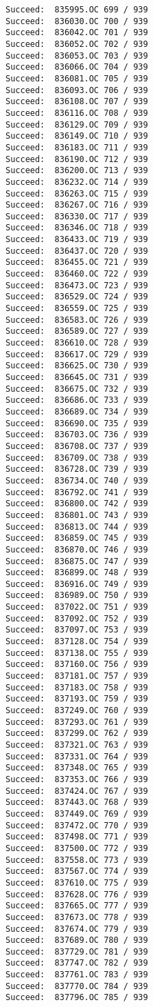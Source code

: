 \documentclass[11pt]{article}
\begin{document}
\begin{verbatim}
Succeed:  835995.OC 699 / 939
Succeed:  836030.OC 700 / 939
Succeed:  836042.OC 701 / 939
Succeed:  836052.OC 702 / 939
Succeed:  836053.OC 703 / 939
Succeed:  836066.OC 704 / 939
Succeed:  836081.OC 705 / 939
Succeed:  836093.OC 706 / 939
Succeed:  836108.OC 707 / 939
Succeed:  836116.OC 708 / 939
Succeed:  836129.OC 709 / 939
Succeed:  836149.OC 710 / 939
Succeed:  836183.OC 711 / 939
Succeed:  836190.OC 712 / 939
Succeed:  836200.OC 713 / 939
Succeed:  836232.OC 714 / 939
Succeed:  836263.OC 715 / 939
Succeed:  836267.OC 716 / 939
Succeed:  836330.OC 717 / 939
Succeed:  836346.OC 718 / 939
Succeed:  836433.OC 719 / 939
Succeed:  836437.OC 720 / 939
Succeed:  836455.OC 721 / 939
Succeed:  836460.OC 722 / 939
Succeed:  836473.OC 723 / 939
Succeed:  836529.OC 724 / 939
Succeed:  836559.OC 725 / 939
Succeed:  836583.OC 726 / 939
Succeed:  836589.OC 727 / 939
Succeed:  836610.OC 728 / 939
Succeed:  836617.OC 729 / 939
Succeed:  836625.OC 730 / 939
Succeed:  836645.OC 731 / 939
Succeed:  836675.OC 732 / 939
Succeed:  836686.OC 733 / 939
Succeed:  836689.OC 734 / 939
Succeed:  836690.OC 735 / 939
Succeed:  836703.OC 736 / 939
Succeed:  836708.OC 737 / 939
Succeed:  836709.OC 738 / 939
Succeed:  836728.OC 739 / 939
Succeed:  836734.OC 740 / 939
Succeed:  836792.OC 741 / 939
Succeed:  836800.OC 742 / 939
Succeed:  836801.OC 743 / 939
Succeed:  836813.OC 744 / 939
Succeed:  836859.OC 745 / 939
Succeed:  836870.OC 746 / 939
Succeed:  836875.OC 747 / 939
Succeed:  836899.OC 748 / 939
Succeed:  836916.OC 749 / 939
Succeed:  836989.OC 750 / 939
Succeed:  837022.OC 751 / 939
Succeed:  837092.OC 752 / 939
Succeed:  837097.OC 753 / 939
Succeed:  837128.OC 754 / 939
Succeed:  837138.OC 755 / 939
Succeed:  837160.OC 756 / 939
Succeed:  837181.OC 757 / 939
Succeed:  837183.OC 758 / 939
Succeed:  837193.OC 759 / 939
Succeed:  837249.OC 760 / 939
Succeed:  837293.OC 761 / 939
Succeed:  837299.OC 762 / 939
Succeed:  837321.OC 763 / 939
Succeed:  837331.OC 764 / 939
Succeed:  837348.OC 765 / 939
Succeed:  837353.OC 766 / 939
Succeed:  837424.OC 767 / 939
Succeed:  837443.OC 768 / 939
Succeed:  837449.OC 769 / 939
Succeed:  837472.OC 770 / 939
Succeed:  837498.OC 771 / 939
Succeed:  837500.OC 772 / 939
Succeed:  837558.OC 773 / 939
Succeed:  837567.OC 774 / 939
Succeed:  837610.OC 775 / 939
Succeed:  837628.OC 776 / 939
Succeed:  837665.OC 777 / 939
Succeed:  837673.OC 778 / 939
Succeed:  837674.OC 779 / 939
Succeed:  837689.OC 780 / 939
Succeed:  837729.OC 781 / 939
Succeed:  837747.OC 782 / 939
Succeed:  837761.OC 783 / 939
Succeed:  837770.OC 784 / 939
Succeed:  837796.OC 785 / 939

\end{verbatim}
\end{document}
